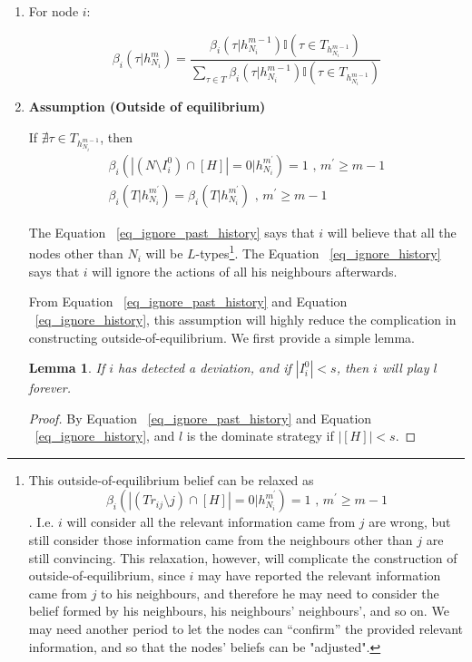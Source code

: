 \documentclass[12pt]{article}
\newtheorem{lemma}{Lemma}[subsection]
\theoremstyle{remark}
\theoremstyle{remark}
\begin{document}
\begin{enumerate}
\item For node $i$:

\begin{equation}
\beta_{i}(\tau |h^{m}_{N_i})=\frac{\beta_{i}(\tau |h^{m-1}_{N_i})\mathbb{I}(\tau \in T_{h^{m-1}_{N_i}})}{\sum_{\tau \in T}\beta_{i}(\tau |h^{m-1}_{N_i})\mathbb{I}(\tau \in T_{h^{m-1}_{N_i}})} \label{eq_eq_belief}
\end{equation} 

\item \textbf{Assumption (Outside of equilibrium)}

If $\nexists \tau \in T_{h^{m-1}_{N_i}} $, then
\begin{eqnarray}
\beta_{i}(|(N\setminus I^0_i)\cap [H]|=0|h^{m^{'}}_{N_i})=1 \text{ , } m^{'}\geq m-1 \label{eq_ignore_past_history}\\
\beta_{i}(T|h^{m^{'}}_{N_i})=\beta_{i}(T|h^{m^{'}}_{N_i}) \text{ , } m^{'}\geq m-1\label{eq_ignore_history}
\end{eqnarray}

The Equation ~\ref{eq_ignore_past_history} says that $i$ will believe that all the nodes other than $N_i$ will be $L$-types\footnote{This outside-of-equilibrium belief can be relaxed as \[\beta_{i}(|(Tr_{ij}\setminus j)\cap [H]|=0|h^{m^{'}}_{N_i})=1 \text{ , } m^{'}\geq m-1 \]. I.e. $i$ will consider all the relevant information came from $j$ are wrong, but still consider those information came from the neighbours other than $j$ are still convincing. This relaxation, however, will complicate the construction of outside-of-equilibrium, since $i$ may have reported the relevant information came from $j$ to his neighbours, and therefore he may need to consider the belief formed by his neighbours, his neighbours' neighbours', and so on. We may need another period to let the nodes can ``confirm'' the provided relevant information, and so that the nodes' beliefs can be "adjusted".}. The Equation ~\ref{eq_ignore_history} says that $i$ will ignore the actions of all his neighbours afterwards.

From Equation ~\ref{eq_ignore_past_history} and Equation ~\ref{eq_ignore_history}, this assumption will highly reduce the complication in constructing outside-of-equilibrium. We first provide a simple lemma.

\begin{lemma}
\label{lemma_outside_eq_strategy}
If $i$ has detected a deviation, and if $|I^0_i|<s$, then $i$ will play $l$ forever.
\end{lemma}
\begin{proof}
By Equation ~\ref{eq_ignore_past_history} and Equation ~\ref{eq_ignore_history}, and $l$ is the dominate strategy if $|[H]|<s$.
\end{proof}

\end{enumerate}
\end{document}

